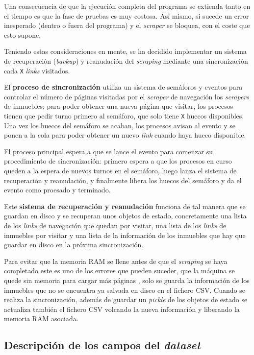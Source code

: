 \documentclass[12pt]{article}
\begin{document}
Una consecuencia de que la ejecución completa del programa se extienda tanto en el tiempo es que la fase de pruebas es muy costosa. Así mismo, si sucede un error inesperado (dentro o fuera del programa) y el \textit{scraper} se bloquea, con el coste que esto supone.

Teniendo estas consideraciones en mente, se ha decidido implementar un sistema de recuperación (\textit{backup}) y reanudación del \textit{scraping} mediante una sincronización cada \verb|X| \textit{links} visitados.

El \textbf{proceso de sincronización} utiliza un sistema de semáforos y eventos para controlar el número de páginas visitadas por el \textit{scraper} de navegación los \textit{scrapers} de inmuebles; para poder obtener una nueva página que visitar, los procesos tienen que pedir turno primero al semáforo, que solo tiene \verb|X| huecos disponibles. Una vez los huecos del semáforo se acaban, los procesos avisan al evento y se ponen a la cola para poder obtener un nuevo \textit{link} cuando haya hueco disponible.

El proceso principal espera a que se lance el evento para comenzar su procedimiento de sincronización: primero espera a que los procesos en curso queden a la espera de nuevos turnos en el semáforo, luego lanza el sistema de recuperación y reanudación, y finalmente libera los huecos del semáforo y da el evento como proesado y terminado.

Este \textbf{sistema de recuperación y reanudación} funciona de tal manera que se guardan en disco y se recuperan unos objetos de estado, concretamente una lista de los \textit{links} de navegación que quedan por visitar, una lista de los \textit{links} de inmuebles por visitar y una lista de la información de los inmuebles que hay que guardar en disco en la próxima sincronización.

Para evitar que la memoria RAM se llene antes de que el \textit{scraping} se haya completado \textemdash este es uno de los errores que pueden suceder, que la máquina se quede sin memoria para cargar más páginas \textemdash, solo se guarda la información de los inmuebles que no se encuentra ya salvada en disco en el fichero CSV. Cuando se realiza la sincronización, además de guardar un \textit{pickle} de los objetos de estado se actualiza también el fichero CSV volcando la nueva información y liberando la memoria RAM asociada.

\vspace{-1.5em}\subsection*{Descripción de los campos del \textit{dataset}}\vspace{-1em}
\end{document}

